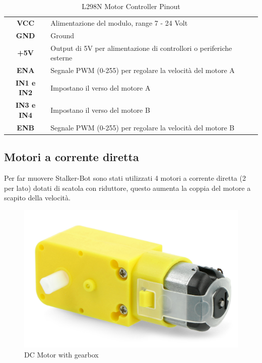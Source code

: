 \documentclass[12pt]{report}
\begin{document}
\begin{table}[h]
    \centering
    \begin{tabular}{ |c|p{7cm}|  }
    \hline
    \rowcolor{blue!35}\multicolumn{2}{|c|}{\Large\textbf{L298N Motor Controller Pinout}} \\
    \hline
    \textbf{VCC} & Alimentazione del modulo, range 7 - 24 Volt\\
    \textbf{GND} & Ground\\
    \textbf{+5V} & Output di 5V per alimentazione di controllori o periferiche esterne\\
    \hline
    \textbf{ENA} & Segnale PWM (0-255) per regolare la velocità del motore A\\
    \textbf{IN1 e IN2} & Impostano il verso del motore A\\
    \textbf{IN3 e IN4} & Impostano il verso del motore B\\
    \textbf{ENB} & Segnale PWM (0-255) per regolare la velocità del motore B\\
    \hline
    \end{tabular}
    \caption{L298N Motor Controller Pinout}
    \label{tab:requisiti_funzionali}
\end{table}
\vspace{0.5cm}


\subsection*{Motori a corrente diretta}
Per far muovere Stalker-Bot sono stati utilizzati 4 motori a corrente diretta (2 per lato) dotati di scatola con riduttore, questo aumenta la coppia del motore a scapito della velocità.
\FloatBarrier
\begin{figure}
\centering
    \includegraphics[width=0.25\linewidth]{images/components/motor_geared.jpg} 
    \caption{DC Motor with gearbox}
    \label{fig:wrapfig}
\end{figure}
\FloatBarrier
\end{document}
